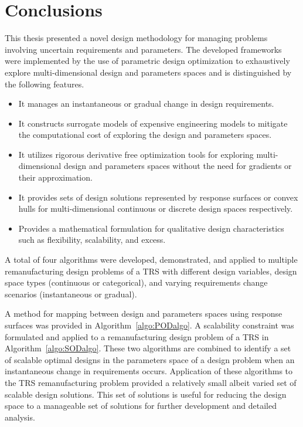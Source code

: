 \chapter{Conclusions}
\label{ch:conclusion}

This thesis presented a novel design methodology for managing problems involving uncertain requirements and parameters. The developed frameworks were implemented by the use of parametric design optimization to exhaustively explore multi-dimensional design and parameters spaces and is distinguished by the following features.

\begin{itemize}
    \item It manages an instantaneous or gradual change in design requirements.
    \item It constructs surrogate models of expensive engineering models to mitigate the computational cost of exploring the design and parameters spaces.
    \item It utilizes rigorous derivative free optimization tools for exploring multi-dimensional design and parameters spaces without the need for gradients or their approximation.
    \item It provides sets of design solutions represented by response surfaces or convex hulls for multi-dimensional continuous or discrete design spaces respectively.
    \item Provides a mathematical formulation for qualitative design characteristics such as flexibility, scalability, and excess.
\end{itemize}

A total of four algorithms were developed, demonstrated, and applied to multiple remanufacturing design problems of a \ac{TRS} with different design variables, design space types (continuous or categorical), and varying requirements change scenarios (instantaneous or gradual). 

A method for mapping between design and parameters spaces using response surfaces was provided in Algorithm~\ref{algo:PODalgo}. A scalability constraint was formulated and applied to a remanufacturing design problem of a \ac{TRS} in Algorithm~\ref{algo:SODalgo}. These two algorithms are combined to identify a set of scalable optimal designs in the parameters space of a design problem when an instantaneous change in requirements occurs. Application of these algorithms to the \ac{TRS} remanufacturing problem provided a relatively small albeit varied set of scalable design solutions. This set of solutions is useful for reducing the design space to a manageable set of solutions for further development and detailed analysis.

